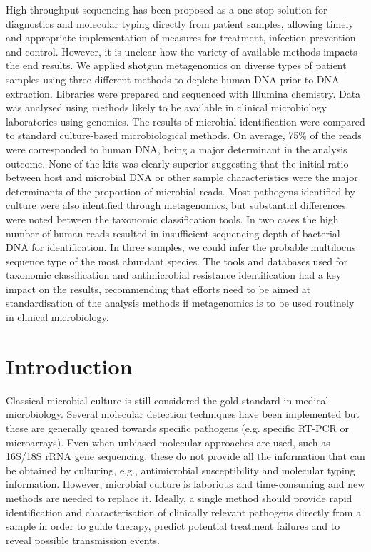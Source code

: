 High throughput sequencing has been proposed as a one-stop solution for diagnostics and molecular typing directly from patient samples, allowing timely and appropriate implementation of measures for treatment, infection prevention and control. 
However, it is unclear how the variety of available methods impacts the end results. 
We applied shotgun metagenomics on diverse types of patient samples using three different methods to deplete human DNA prior to DNA extraction.
Libraries were prepared and sequenced with Illumina chemistry. 
Data was analysed using methods likely to be available in clinical microbiology laboratories using genomics. 
The results of microbial identification were compared to standard culture-based microbiological methods. 
On average, 75\% of the reads were corresponded to human DNA, being a major determinant in the analysis outcome. 
None of the kits was clearly superior suggesting that the initial ratio between host and microbial DNA or other sample characteristics were the major determinants of the proportion of microbial reads. 
Most pathogens identified by culture were also identified through metagenomics, but substantial differences were noted between the taxonomic classification tools. 
In two cases the high number of human reads resulted in insufficient sequencing depth of bacterial DNA for identification. 
In three samples, we could infer the probable multilocus sequence type of the most abundant species. 
The tools and databases used for taxonomic classification and antimicrobial resistance identification had a key impact on the results, recommending that efforts need to be aimed at standardisation of the analysis methods if metagenomics is to be used routinely in clinical microbiology.

\section{Introduction} \label{sec:ch2_introduction}

Classical microbial culture is still considered the gold standard in medical microbiology. 
Several molecular detection techniques have been implemented but these are generally geared towards specific pathogens (e.g. specific RT-PCR or microarrays). 
Even when unbiased molecular approaches are used, such as 16S/18S rRNA gene sequencing, these do not provide all the information that can be obtained by culturing, e.g., antimicrobial susceptibility and molecular typing information. 
However, microbial culture is laborious and time-consuming and new methods are needed to replace it. 
Ideally, a single method should provide rapid identification and characterisation of clinically relevant pathogens directly from a sample in order to guide therapy, predict potential treatment failures and to reveal possible transmission events.

